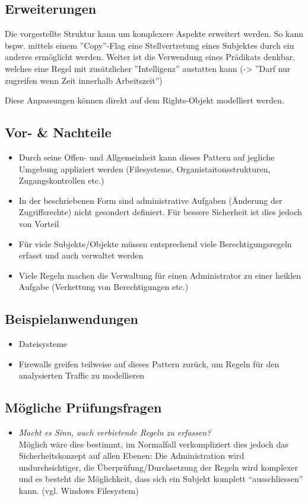 \subsection*{Erweiterungen}
Die vorgestellte Struktur kann um komplexere Aspekte erweitert werden. So kann bspw. mittels einem ''Copy''-Flag eine Stellvertretung eines Subjektes durch ein anderes ermöglicht werden.
Weiter ist die Verwendung eines Prädikats denkbar, welches eine Regel mit zusätzlicher ''Intelligenz'' austatten kann (-> ''Darf nur zugreifen wenn Zeit innerhalb Arbeitszeit'')

Diese Anpassungen können direkt auf dem Rights-Objekt modelliert werden.

\subsection*{Vor- \& Nachteile}
\begin{itemize}
	\item Durch seine Offen- und Allgemeinheit kann dieses Pattern auf jegliche Umgebung appliziert werden (Filesysteme, Organistaitonsstrukturen, Zugangskontrollen etc.)
	\item In der beschriebenen Form sind administrative Aufgaben (Änderung der Zugriffsrechte) nicht gesondert definiert. Für bessere Sicherheit ist dies jedoch von Vorteil
	\item Für viele Subjekte/Objekte müssen entsprechend viele Berechtigungsregeln erfasst und auch verwaltet werden
	\item Viele Regeln machen die Verwaltung für einen Administrator zu einer heiklen Aufgabe (Verkettung von Berechtigungen etc.)
\end{itemize}

\subsection*{Beispielanwendungen}
\begin{itemize}
	\item Dateisysteme
	\item Firewalls greifen teilweise auf dieses Pattern zurück, um Regeln für den analysierten Traffic zu modellieren
\end{itemize}

\subsection*{Mögliche Prüfungsfragen}
\begin{itemize}
	\item \emph{Macht es Sinn, auch verbietende Regeln zu erfassen?}\\
	Möglich wäre dies bestimmt, im Normalfall verkompliziert dies jedoch das Sicherheitskonzept auf allen Ebenen: Die Administration wird undurchsichtiger, die Überprüfung/Durchsetzung der Regeln wird komplexer und es besteht die Möglichkeit, dass sich ein Subjekt komplett ``ausschliessen'' kann. (vgl. Windows Filesystem)
\end{itemize}